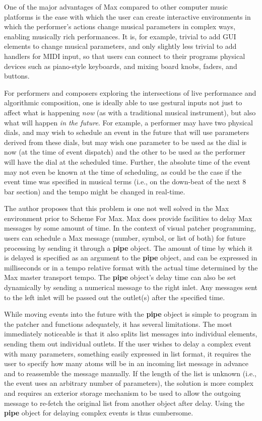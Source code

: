 \documentclass[acmsmall, anonymous, review]{acmart}
\begin{document}
One of the major advantages of Max compared to other computer music platforms 
is the ease with which the user can create interactive environments in which the performer's actions 
change musical parameters in complex ways, enabling 
musically rich performances. It is, for example, trivial to add GUI elements to change
musical parameters, and only slightly less trivial to add handlers for MIDI input, 
so that users can connect to their programs physical devices such as
piano-style keyboards, and mixing board knobs, faders, and buttons. 

For performers and composers exploring the intersections of live performance and algorithmic
composition, one is ideally able to use gestural inputs not just to affect
what is happening \textit{now} (as with a traditional musical instrument), but also what will 
happen \textit{in the future}. For example, a performer may have two physical dials,
and may wish to schedule an event in the future that will use parameters derived
from these dials, but may wish one parameter to be used as the dial is now
(at the time of event dispatch) 
and the other to be used as the performer will have the dial at the scheduled time.
Further, the absolute time of the event may not even be known at the time of 
scheduling, as could be the case if the event time was specified in musical terms 
(i.e., on the down-beat of the next 8 bar section) and the tempo might be changed in real-time. 

The author proposes that this problem is one not well solved in the Max environment prior 
to Scheme For Max. Max does provide facilities to delay Max messages by some
amount of time. In the context of visual patcher programming, users can schedule 
a Max message (number, symbol, or list of both) for future processing by sending it through a 
\textbf{pipe} object. The amount of time by which it is delayed is specified as an argument to 
the \textbf{pipe} object, and can be expressed in milliseconds or in a tempo 
relative format with the actual time determined by the Max master transport tempo. 
The \textbf{pipe} object’s delay time can also be set dynamically by sending a numerical message
to the right inlet. Any messages sent to the left inlet will be passed out
the outlet(s) after the specified time. 

While moving events into the future with the \textbf{pipe} object is simple to program 
in the patcher and functions adequately, 
it has several limitations. The most immediately noticeable is that it also splits 
list messages into individual elements, sending them out individual outlets. 
If the user wishes to delay a complex event with many parameters, something easily 
expressed in list format, it requires the user to specify how many atoms will 
be in an incoming list message in advance and to reassemble the message manually.
If the length of the list is unknown (i.e., the event uses an arbitrary number
of parameters), the solution is more complex and requires 
an exterior storage mechanism to be used to allow the outgoing 
message to re-fetch the original list from another object after delay. Using
the \textbf{pipe} object for delaying complex events is thus cumbersome. 
\end{document}
